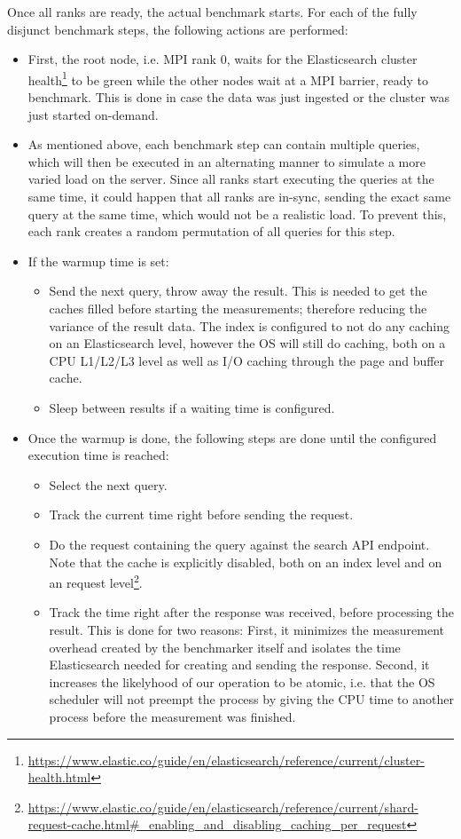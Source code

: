 Once all ranks are ready, the actual benchmark starts. For each of the fully disjunct benchmark steps, the following actions are performed:
\begin{itemize}
  \item First, the root node, i.e. \ac{MPI} rank 0, waits for the Elasticsearch cluster health\footnote{\url{https://www.elastic.co/guide/en/elasticsearch/reference/current/cluster-health.html}} to be green while the other nodes wait at a \ac{MPI} barrier, ready to benchmark. This is done in case the data was just ingested or the cluster was just started on-demand.
  \item As mentioned above, each benchmark step can contain multiple queries, which will then be executed in an alternating manner to simulate a more varied load on the server. Since all ranks start executing the queries at the same time, it could happen that all ranks are in-sync, sending the exact same query at the same time, which would not be a realistic load. To prevent this, each rank creates a random permutation of all queries for this step.
  \item If the warmup time is set:
    \begin{itemize}
      \item Send the next query, throw away the result. This is needed to get the caches filled before starting the measurements; therefore reducing the variance of the result data. The index is configured to not do any caching on an Elasticsearch level, however the OS will still do caching, both on a CPU L1/L2/L3 level as well as I/O caching through the page and buffer cache.
      \item Sleep between results if a waiting time is configured.
    \end{itemize}
  \item Once the warmup is done, the following steps are done until the configured execution time is reached:
    \begin{itemize}
      \item Select the next query.
      \item Track the current time right before sending the request.
      \item Do the request containing the query against the search API endpoint. Note that the cache is explicitly disabled, both on an index level and on an request level\footnote{\url{https://www.elastic.co/guide/en/elasticsearch/reference/current/shard-request-cache.html\#_enabling_and_disabling_caching_per_request}}.
      \item Track the time right after the response was received, before processing the result. This is done for two reasons: First, it minimizes the measurement overhead created by the benchmarker itself and isolates the time Elasticsearch needed for creating and sending the response. Second, it increases the likelyhood of our operation to be atomic, i.e. that the OS scheduler will not preempt the process by giving the CPU time to another process before the measurement was finished.

\end{itemize}
\end{itemize}
